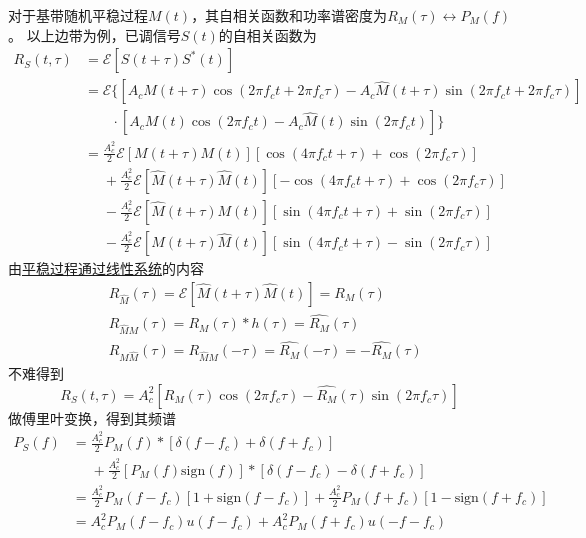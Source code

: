     对于基带随机平稳过程$M(t)$，其自相关函数和功率谱密度为$R_M(\tau)\leftrightarrow P_M(f)$。
    以上边带为例，已调信号$S(t)$的自相关函数为
    \begin{equation*}
        \begin{split}
            R_S(t,\tau) &=\mathscr{E}[S(t+\tau)S^*(t)]\\
                        &=\mathscr{E}\{[A_cM(t+\tau)\cos(2\pi f_ct+2\pi f_c\tau)-A_c\hat{M}(t+\tau)\sin(2\pi f_ct+2\pi f_c\tau)]\\
                        &\phantom{=\mathscr{E}}\cdot[A_cM(t)\cos(2\pi f_ct)-A_c\hat{M}(t)\sin(2\pi f_ct)]\}\\
                        &           =\frac{A_c^2}{2}\mathscr{E}[M(t+\tau)M(t)]            [\cos(4\pi f_ct+\tau)+\cos(2\pi f_c\tau)]\\
                        &\phantom{=}+\frac{A_c^2}{2}\mathscr{E}[\hat{M}(t+\tau)\hat{M}(t)][-\cos(4\pi f_ct+\tau)+\cos(2\pi f_c\tau)]\\
                        &\phantom{=}-\frac{A_c^2}{2}\mathscr{E}[\hat{M}(t+\tau)M(t)]      [\sin(4\pi f_ct+\tau)+\sin(2\pi f_c\tau)]\\
                        &\phantom{=}-\frac{A_c^2}{2}\mathscr{E}[M(t+\tau)\hat{M}(t)]      [\sin(4\pi f_ct+\tau)-\sin(2\pi f_c\tau)]
        \end{split}
    \end{equation*}
    由\hyperref[subsubsec:LITsystem]{平稳过程通过线性系统}的内容
    \begin{align}
        &R_{\hat{M}}(\tau)=\mathscr{E}[\hat{M}(t+\tau)\hat{M}(t)]=R_{M}(\tau)\\
        &R_{\hat{M}M}(\tau)=R_{M}(\tau)*h(\tau)=\hat{R_{M}}(\tau)\\
        &R_{M\hat{M}}(\tau)=R_{\hat{M}M}(-\tau)=\hat{R_{M}}(-\tau)=-\hat{R_{M}}(\tau)
    \end{align}
    不难得到
    \begin{equation}
        R_S(t,\tau)=  A_c^2[R_M(\tau)\cos(2\pi f_c\tau)-\hat{R_{M}}(\tau)\sin(2\pi f_c\tau)]
    \end{equation}
    做傅里叶变换，得到其频谱
    \begin{equation}
        \begin{split}
            P_S(f)  &=\frac{A_c^2}{2}P_M(f)*[\delta(f-f_c)+\delta(f+f_c)]\\
                    &\phantom{=}+\frac{A_c^2}{2}[P_M(f)\text{sign}(f)]*[\delta(f-f_c)-\delta(f+f_c)]\\
                    &=\frac{A_c^2}{2}P_M(f-f_c)[1+\text{sign}(f-f_c)]+\frac{A_c^2}{2}P_M(f+f_c)[1-\text{sign}(f+f_c)]\\
                    &=A_c^2P_M(f-f_c)u(f-f_c)+A_c^2P_M(f+f_c)u(-f-f_c)
        \end{split}
    \end{equation}

